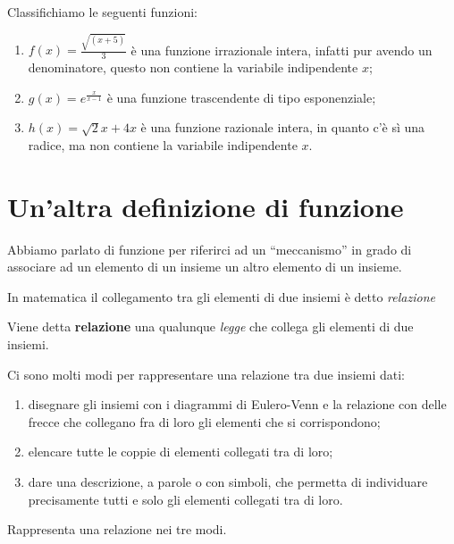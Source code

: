 \begin{esempio}
Classifichiamo le seguenti funzioni: 
\begin{enumerate}
\item \(f(x) = \frac{\sqrt{(x+5)}}{3}\) è una funzione 
irrazionale intera, infatti pur avendo un denominatore, questo non contiene 
la variabile indipendente \(x\);
\item \(g(x) = e^{\frac{x}{x-1}}\) è una funzione 
trascendente di tipo esponenziale;
\item \(h(x) = \sqrt{2}x+4x\) è una funzione razionale 
intera, in quanto c'è sì una radice, ma non contiene la variabile 
indipendente \(x\).
\end{enumerate}
\end{esempio}

\newpage %

\section{Un'altra definizione di funzione}

Abbiamo parlato di funzione per riferirci ad un ``meccanismo'' in grado di 
associare ad un elemento di un insieme un altro elemento di un insieme.

In matematica il collegamento tra gli elementi di due insiemi è detto 
\emph{relazione}

\begin{definizione}
Viene detta \textbf{relazione} una qualunque \emph{legge} che collega gli 
elementi di due insiemi.
\end{definizione}

Ci sono molti modi per rappresentare una relazione tra due insiemi dati:
\begin{enumerate}
\item disegnare gli insiemi con i diagrammi di Eulero-Venn e la relazione 
con delle frecce che collegano fra di loro gli elementi che si corrispondono; 
\item elencare tutte le coppie di elementi collegati tra di loro; 
\item dare una descrizione, a parole o con simboli, che permetta di individuare 
precisamente tutti e solo gli elementi collegati tra di loro. 
\end{enumerate}

\begin{esempio}
Rappresenta una relazione nei tre modi.\\

\end{esempio}

